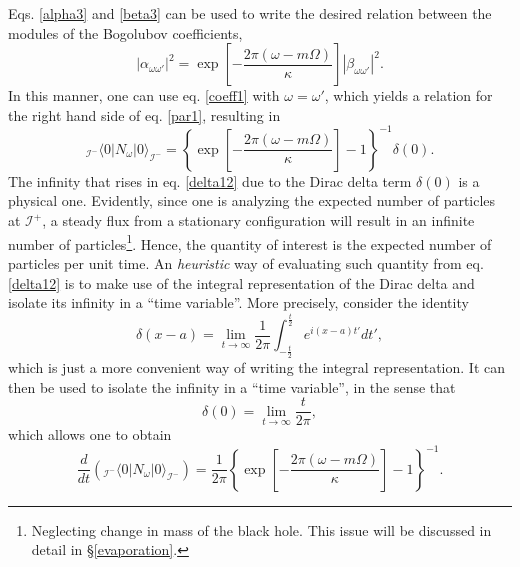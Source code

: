 \documentclass[
12pt,		%
openright,	%
twoside,  %
a4paper,			%
chapter=TITLE,		%
english,			%
french,				%
spanish,			%
brazil				%
]{USPSC-classe/USPSC}
\begin{document}
Eqs. \ref{alpha3} and \ref{beta3} can be used to write the desired relation between the modules of the Bogolubov coefficients,
\begin{equation}
    |\alpha_{\omega\omega'}|^2=\exp\left[{-\frac{2\pi(\omega-m\Omega)}{\kappa}}\right]|\beta_{\omega\omega'}|^2.
\end{equation}
In this manner, one can use eq. \ref{coeff1} with $\omega=\omega'$, which yields a relation for the right hand side of eq. \ref{par1}, resulting in 
\begin{equation}\label{delta12}
    _{{\mathscr{I}^-}}\langle0|N_{\omega}|0\rangle_{\mathscr{I}^-}=\left\{\exp\left[{-\frac{2\pi(\omega-m\Omega)}{\kappa}}\right]-1\right\}^{-1}\delta(0).
\end{equation}
The infinity that rises in eq. \ref{delta12} due to the Dirac delta term $\delta(0)$ \cite{Butkov1973} is a physical one. Evidently, since one is analyzing the expected number of particles at $\mathscr{I}^+$, a steady flux from a stationary configuration will result in an infinite number of particles\footnote{Neglecting change in mass of the black hole. This issue will be discussed in detail in \S\;\ref{evaporation}.}. Hence, the quantity of interest is the expected number of particles per unit time. An \textit{heuristic} way of evaluating such quantity from eq. \ref{delta12} is to make use of the integral representation of the Dirac delta and isolate its infinity in a ``time variable''. More precisely, consider the identity
\begin{equation}
    \delta(x-a)=\lim_{t\to\infty}\frac{1}{2\pi}\int_{-\frac{t}{2}}^{\frac{t}{2}}e^{i(x-a)t'}dt',
\end{equation}
which is just a more convenient way of writing the integral representation. It can then be used to isolate the infinity in a ``time variable'', in the sense that 
\begin{equation}
    \delta(0)=\lim_{t\to\infty}\frac{t}{2\pi},
\end{equation}
which allows one to obtain
\begin{equation}\label{flux}
    \frac{d}{dt}\left(_{{\mathscr{I}^-}}\langle0|N_{\omega}|0\rangle_{\mathscr{I}^-}\right)=\frac{1}{2\pi}\left\{\exp\left[{-\frac{2\pi (\omega-m\Omega)}{\kappa}}\right]-1\right\}^{-1}.
\end{equation}
\end{document}
